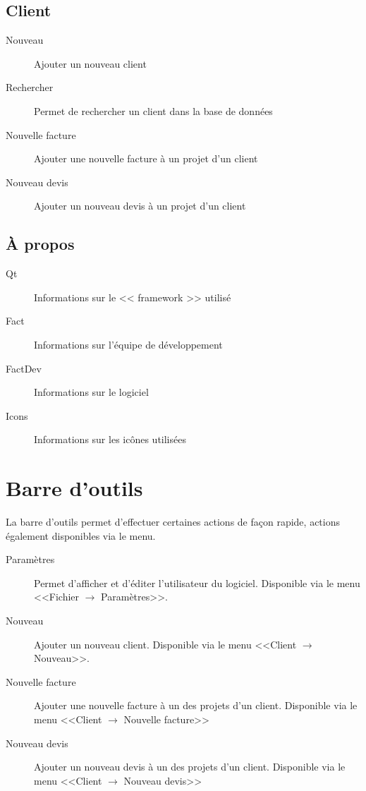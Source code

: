 \subsection{Client}
\begin{description}
	\item[Nouveau] Ajouter un nouveau client
	\item[Rechercher] Permet de rechercher un client dans la base de données
	\item[Nouvelle facture]  Ajouter une nouvelle facture à un projet d’un client
	\item[Nouveau devis] Ajouter un nouveau devis à un projet d’un client
\end{description}
\subsection{À propos}
\begin{description}
	\item[Qt] Informations sur le << framework >> utilisé
	\item[Fact] Informations sur l'équipe de développement
	\item[FactDev]Informations sur le logiciel
	\item[Icons] Informations sur les icônes utilisées
\end{description}
\section{Barre d'outils}
La barre d’outils permet d’effectuer certaines actions de façon rapide, actions également disponibles via le menu.

\begin{description}
	\item[Paramètres] Permet d'afficher et d’éditer l'utilisateur du logiciel. Disponible via le menu <<Fichier $\rightarrow$ Paramètres>>.
	\item[Nouveau] Ajouter un nouveau client. Disponible via le menu <<Client $\rightarrow$ Nouveau>>.
	\item[Nouvelle facture]  Ajouter une nouvelle facture à un des projets d’un client. Disponible via le menu <<Client $\rightarrow$ Nouvelle facture>>
	\item[Nouveau devis] Ajouter un nouveau devis à un des projets d’un client. Disponible via le menu <<Client $\rightarrow$ Nouveau devis>>
\end{description}


